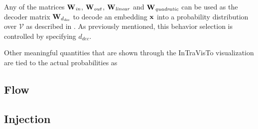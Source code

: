     Any of the matrices $\bm{\mathbf{W}}_\textit{in}$, $\bm{\mathbf{W}}_\textit{out}$, $\bm{\mathbf{W}}_\textit{linear}$ and $\bm{\mathbf{W}}_\textit{quadratic}$ can be used as the decoder matrix $\bm{\mathbf{W}}_{d_\textit{dec}}$ to decode an embedding $\bm{\mathbf{x}}$ into a probability distribution over $\mathcal{V}$ as described in .
    As previously mentioned, this behavior selection is controlled by specifying $d_\textit{dec}$.
    

    Other meaningful quantities that are shown through the InTraVisTo visualization are tied to the actual probabilities as

\subsection{Flow}


\subsection{Injection}

